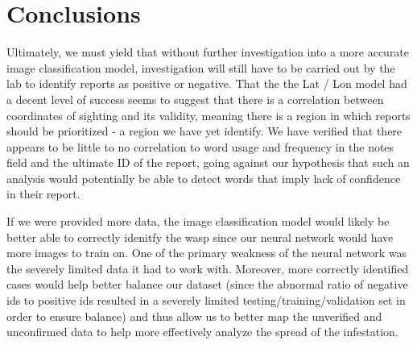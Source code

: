 \documentclass[letterpaper]{article}
\begin{document}
\section{Conclusions}
Ultimately, we must yield that without further investigation into a more accurate image classification model, investigation will still have to be carried out by the lab to identify reports as positive or negative. That the the Lat / Lon model had a decent level of success seems to suggest that there is a correlation between coordinates of sighting and its validity, meaning there is a region in which reports should be prioritized - a region we have yet identify. We have verified that there appears to be little to no correlation to word usage and frequency in the notes field and the ultimate ID of the report, going against our hypothesis that such an analysis would potentially be able to detect words that imply lack of confidence in their report. 


If we were provided more data, the image classification model would likely be better able to correctly idenitfy the wasp since our neural network would have more images to train on. One of the primary weakness of the neural network was the severely limited data it had to work with. Moreover, more correctly identified cases would help better balance our dataset (since the abnormal ratio of negative ids to positive ids resulted in a severely limited testing/training/validation set in order to ensure balance) and thus allow us to better map the unverified and unconfirmed data to help more effectively analyze the spread of the infestation.
\end{document}
